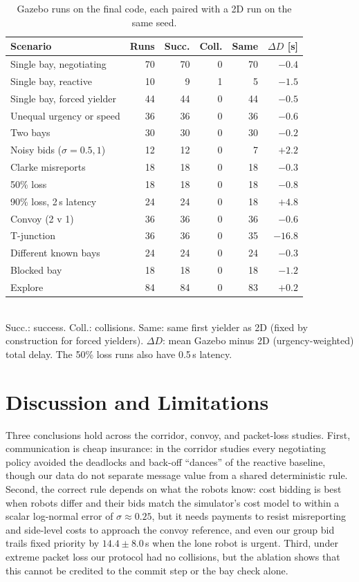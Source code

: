 \documentclass[letterpaper,journal]{IEEEtran}
\begin{document}
\begin{table}[t]\centering
\caption{Gazebo runs on the final code, each paired with a 2D run on the same seed.}
\label{tab:gz}
{\footnotesize\setlength{\tabcolsep}{4pt}
\begin{tabular}{@{}lrrrrr@{}}\toprule
Scenario & Runs & Succ. & Coll. & Same & $\Delta D$ [s]\\\midrule
Single bay, negotiating & 70 & 70 & 0 & 70 & $-0.4$\\
Single bay, reactive & 10 & 9 & 1 & 5 & $-1.5$\\
Single bay, forced yielder & 44 & 44 & 0 & 44 & $-0.5$\\
Unequal urgency or speed & 36 & 36 & 0 & 36 & $-0.6$\\
Two bays & 30 & 30 & 0 & 30 & $-0.2$\\
Noisy bids ($\sigma=0.5,1$) & 12 & 12 & 0 & 7 & $+2.2$\\
Clarke misreports & 18 & 18 & 0 & 18 & $-0.3$\\
50\% loss & 18 & 18 & 0 & 18 & $-0.8$\\
90\% loss, 2\,s latency & 24 & 24 & 0 & 18 & $+4.8$\\
Convoy (2 v 1) & 36 & 36 & 0 & 36 & $-0.6$\\
T-junction & 36 & 36 & 0 & 35 & $-16.8$\\
Different known bays & 24 & 24 & 0 & 24 & $-0.3$\\
Blocked bay & 18 & 18 & 0 & 18 & $-1.2$\\
Explore & 84 & 84 & 0 & 83 & $+0.2$\\\bottomrule
\end{tabular}}\\[2pt]
{\footnotesize Succ.: success. Coll.: collisions. Same: same first yielder as 2D (fixed by construction for forced yielders). $\Delta D$: mean Gazebo minus 2D (urgency-weighted) total delay. The 50\% loss runs also have 0.5\,s latency.}
\end{table}

\section{Discussion and Limitations}
Three conclusions hold across the corridor, convoy, and packet-loss studies. First, communication is cheap insurance: in the corridor studies every negotiating policy avoided the deadlocks and back-off ``dances'' of the reactive baseline, though our data do not separate message value from a shared deterministic rule. Second, the correct rule depends on what the robots know: cost bidding is best when robots differ and their bids match the simulator's cost model to within a scalar log-normal error of $\sigma\approx0.25$, but it needs payments to resist misreporting and side-level costs to approach the convoy reference, and even our group bid trails fixed priority by $14.4\pm8.0$\,s when the lone robot is urgent. Third, under extreme packet loss our protocol had no collisions, but the ablation shows that this cannot be credited to the commit step or the bay check alone.
\end{document}

